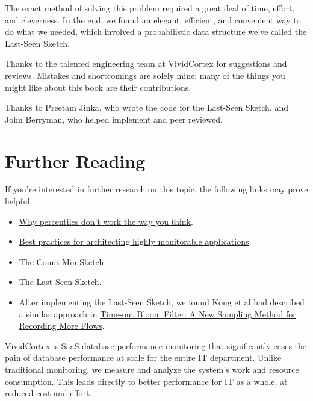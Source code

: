 \documentclass{vivid_layout}
\begin{document}
The exact method of solving this problem required a great deal of time, effort,
and cleverness. In the end, we found an elegant, efficient, and convenient way
to do what we needed, which involved a probabilistic data structure we've called
the Last-Seen Sketch.

Thanks to the talented engineering team at VividCortex for suggestions and
reviews. Mistakes and shortcomings are solely mine; many of the things you might
like about this book are their contributions.

Thanks to Preetam Jinka, who wrote the code for the Last-Seen Sketch, and John Berryman, who helped implement and peer reviewed.

\section{Further Reading}

If you're interested in further research on this topic, the following links may
prove helpful.

\begin{itemize}

\item \href{https://www.vividcortex.com/blog/why-percentiles-dont-work-the-way-you-think}{Why percentiles don't work the way you think}.
\item \href{https://www.vividcortex.com/resources/architecting-highly-monitorable-apps}{Best practices for architecting highly monitorable applications}.
\item \href{https://en.wikipedia.org/wiki/Count\%E2\%80\%93min\_sketch}{The Count-Min Sketch}.
\item \href{https://github.com/VividCortex/lastseen}{The Last-Seen Sketch}.
\item After implementing the Last-Seen Sketch, we found Kong et al had described
a similar approach in
\href{http://pages.cs.wisc.edu/~krobin/documents/kong06icoin.pdf}{Time-out Bloom Filter: A New Sampling Method for Recording More Flows}.

\end{itemize}

\newpage

\begin{about}	%
VividCortex is SaaS database performance monitoring that significantly eases the pain of database performance at scale for the entire IT department. Unlike traditional monitoring, we measure
and analyze the system's work and resource consumption. This leads directly to better performance for IT as a whole, at reduced cost and effort.
\end{about}
\makeresources	%
\end{document}
